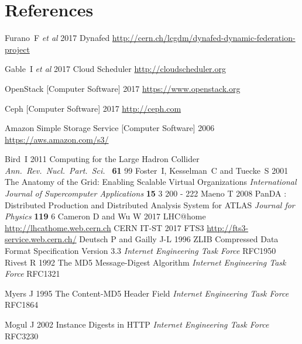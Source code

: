 \documentclass[a4paper]{jpconf}
\begin{document}
\section*{References}
\begin{thebibliography}{9}
  Furano~F {\it et al}
  2017
  Dynafed
  \url{http://cern.ch/lcgdm/dynafed-dynamic-federation-project}

  Gable~I {\it et al}
  2017
  Cloud Scheduler
  \url{http://cloudscheduler.org}

  OpenStack [Computer Software]
  2017
  \url{https://www.openstack.org}

  Ceph [Computer Software]
  2017
  \url{http://ceph.com}

  Amazon Simple Storage Service [Computer Software]
  2006
  \url{https://aws.amazon.com/s3/}

  Bird~I
  2011
  Computing for the Large Hadron Collider
  {\it Ann.\ Rev.\ Nucl.\ Part.\ Sci.\ } {\bf 61} 99
  Foster~I, Kesselman~C and Tuecke~S
  2001
  The Anatomy of the Grid: Enabling Scalable Virtual Organizations
  {\it International Journal of Supercomputer Applications} {\bf 15} 3 200 - 222
  Maeno T
  2008
  PanDA : Distributed Production and Distributed Analysis System for ATLAS
  {\it Journal for Physics} {\bf 119} 6
  Cameron D and Wu W
  2017
  LHC@home
  \url{http://lhcathome.web.cern.ch}
  CERN IT-ST
  2017
  FTS3
  \url{http://fts3-service.web.cern.ch/}
  Deutsch P and Gailly J-L
  1996
  ZLIB Compressed Data Format Specification Version 3.3
  {\it  Internet Engineering Task Force} RFC1950
  Rivest R
  1992
  The MD5 Message-Digest Algorithm
  {\it  Internet Engineering Task Force} RFC1321

  Myers J
  1995
  The Content-MD5 Header Field
  {\it  Internet Engineering Task Force} RFC1864

  Mogul J
  2002
  Instance Digests in HTTP
  {\it  Internet Engineering Task Force} RFC3230

\end{thebibliography}
\end{document}
